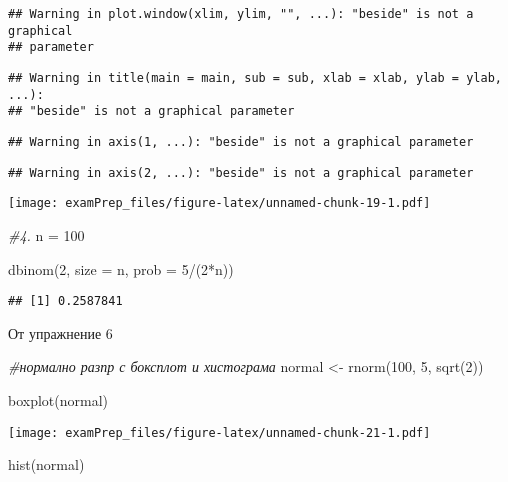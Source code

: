 \documentclass[
]{article}
\newenvironment{Shaded}{\begin{snugshade}}{\end{snugshade}}
\newcommand{\AttributeTok}[1]{\textcolor[rgb]{0.77,0.63,0.00}{#1}}
\newcommand{\CommentTok}[1]{\textcolor[rgb]{0.56,0.35,0.01}{\textit{#1}}}
\newcommand{\DecValTok}[1]{\textcolor[rgb]{0.00,0.00,0.81}{#1}}
\newcommand{\FunctionTok}[1]{\textcolor[rgb]{0.00,0.00,0.00}{#1}}
\newcommand{\NormalTok}[1]{#1}
\newcommand{\OtherTok}[1]{\textcolor[rgb]{0.56,0.35,0.01}{#1}}
\newcommand{\SpecialCharTok}[1]{\textcolor[rgb]{0.00,0.00,0.00}{#1}}
\begin{document}
\begin{verbatim}
## Warning in plot.window(xlim, ylim, "", ...): "beside" is not a graphical
## parameter
\end{verbatim}

\begin{verbatim}
## Warning in title(main = main, sub = sub, xlab = xlab, ylab = ylab, ...):
## "beside" is not a graphical parameter
\end{verbatim}

\begin{verbatim}
## Warning in axis(1, ...): "beside" is not a graphical parameter
\end{verbatim}

\begin{verbatim}
## Warning in axis(2, ...): "beside" is not a graphical parameter
\end{verbatim}

\texttt{[image: examPrep\_files/figure-latex/unnamed-chunk-19-1.pdf]}

\begin{Shaded}
\begin{Highlighting}[]
\CommentTok{\#4.}
\NormalTok{n }\OtherTok{=} \DecValTok{100}

\FunctionTok{dbinom}\NormalTok{(}\DecValTok{2}\NormalTok{, }\AttributeTok{size =}\NormalTok{ n, }\AttributeTok{prob =} \DecValTok{5}\SpecialCharTok{/}\NormalTok{(}\DecValTok{2}\SpecialCharTok{*}\NormalTok{n))}
\end{Highlighting}
\end{Shaded}

\begin{verbatim}
## [1] 0.2587841
\end{verbatim}

От упражнение 6

\begin{Shaded}
\begin{Highlighting}[]
\CommentTok{\#нормално разпр с боксплот и хистограма}
\NormalTok{normal }\OtherTok{\textless{}{-}} \FunctionTok{rnorm}\NormalTok{(}\DecValTok{100}\NormalTok{, }\DecValTok{5}\NormalTok{, }\FunctionTok{sqrt}\NormalTok{(}\DecValTok{2}\NormalTok{))}

\FunctionTok{boxplot}\NormalTok{(normal)}
\end{Highlighting}
\end{Shaded}

\texttt{[image: examPrep\_files/figure-latex/unnamed-chunk-21-1.pdf]}

\begin{Shaded}
\begin{Highlighting}[]
\FunctionTok{hist}\NormalTok{(normal)}
\end{Highlighting}
\end{Shaded}
\end{document}
